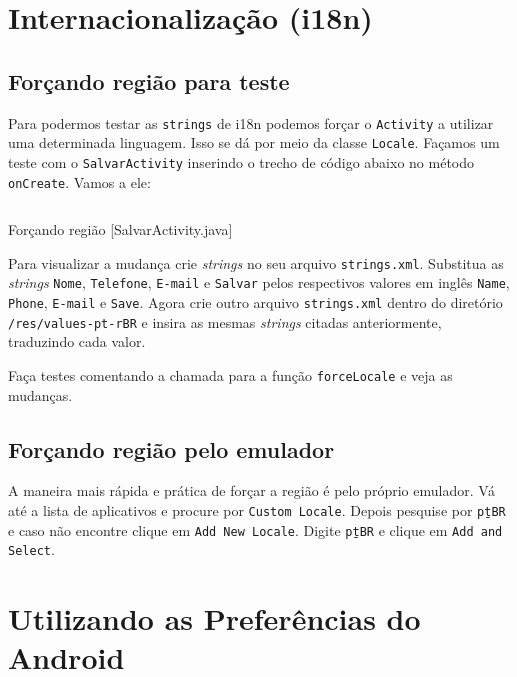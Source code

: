 \section{Internacionalização (i18n)}

\subsection{Forçando região para teste}

Para podermos testar as \texttt{strings} de i18n podemos forçar o \texttt{Activity}
a utilizar uma determinada linguagem. Isso se dá por meio da classe \texttt{Locale}.
Façamos um teste com o \texttt{SalvarActivity} inserindo o trecho de código abaixo no
método \texttt{onCreate}. Vamos a ele:

\begin{listing}[H]
  \inputminted[linenos=true,frame=bottomline,tabsize=3]{ java }{ source/SalvarActivity-5.java }
  \caption{Forçando região [SalvarActivity.java]}
\end{listing}

Para visualizar a mudança crie \textit{strings} no seu arquivo \texttt{strings.xml}. Substitua
as \textit{strings} \texttt{Nome}, \texttt{Telefone}, \texttt{E-mail} e \texttt{Salvar} pelos
respectivos valores em inglês \texttt{Name}, \texttt{Phone}, \texttt{E-mail} e \texttt{Save}.
Agora crie outro arquivo \texttt{strings.xml} dentro do diretório \texttt{/res/values-pt-rBR} e
insira as mesmas \textit{strings} citadas anteriormente, traduzindo cada valor.

Faça testes comentando a chamada para a função \texttt{forceLocale} e veja as mudanças.

\subsection{Forçando região pelo emulador}

A maneira mais rápida e prática de forçar a região é pelo próprio emulador. Vá até a lista de
aplicativos e procure por \texttt{Custom Locale}. Depois pesquise por \texttt{pt\b{ }BR} e caso não encontre
clique em \texttt{Add New Locale}. Digite \texttt{pt\b{ }BR} e clique em \texttt{Add and Select}.

\section{Utilizando as Preferências do Android}

